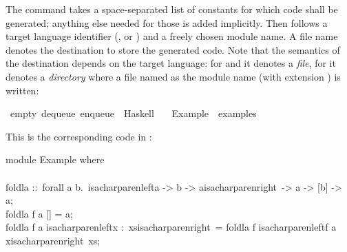 \begin{isabellebody}
%
\endisadelimquote
%
\begin{isamarkuptext}%
\noindent The \hyperlink{command.export-code}{\mbox{}} command takes a space-separated list of
  constants for which code shall be generated;  anything else needed for those
  is added implicitly.  Then follows a target language identifier
  (,  or ) and a freely chosen module name.
  A file name denotes the destination to store the generated code.  Note that
  the semantics of the destination depends on the target language:  for
   and  it denotes a \emph{file}, for 
  it denotes a \emph{directory} where a file named as the module name
  (with extension ) is written:%
\end{isamarkuptext}%
\isamarkuptrue%
%
\isadelimquote
%
\endisadelimquote
%
\isatagquote
{}\isamarkupfalse%
\ empty\ dequeue\ enqueue\ \ Haskell\isanewline
\ \ \ Example\ \ {\isachardoublequoteopen}examples{\isacharslash}{\isachardoublequoteclose}%
\endisatagquote
{\isafoldquote}%
%
\isadelimquote
%
\endisadelimquote
%
\begin{isamarkuptext}%
\noindent This is the corresponding code in :%
\end{isamarkuptext}%
\isamarkuptrue%
%
\isadelimquote
%
\endisadelimquote
%
\isatagquote
%
\begin{isamarkuptext}%
\isatypewriter%
\noindent%
\hspace*{0pt}module Example where {}\\
\hspace*{0pt}\\
\hspace*{0pt}foldla ::~forall a b.~{}{}isacharparenleft{}a -> b -> a{}{}isacharparenright{}~-> a -> [b] -> a;\\
\hspace*{0pt}foldla f a [] = a;\\
\hspace*{0pt}foldla f a {}{}isacharparenleft{}x :~xs{}{}isacharparenright{}~= foldla f {}{}isacharparenleft{}f a x{}{}isacharparenright{}~xs;\\
\hspace*{0pt}\\

\end{isamarkuptext}
\end{isabellebody}
